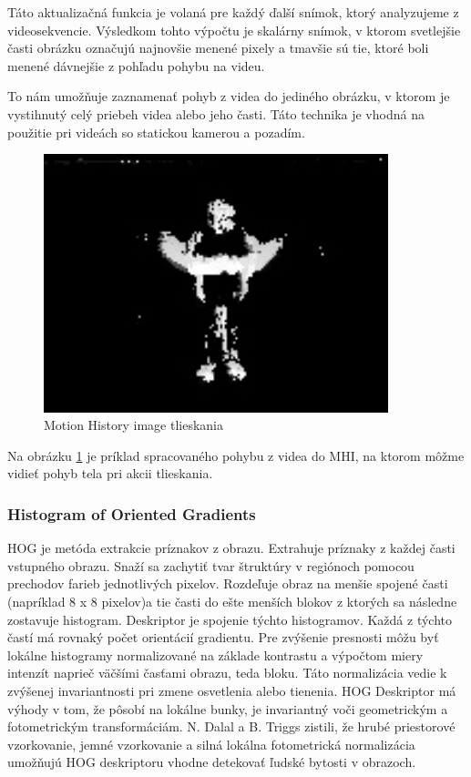 Táto aktualizačná funkcia je volaná pre každý ďalší snímok, ktorý analyzujeme z videosekvencie. Výsledkom tohto výpočtu je skalárny snímok, v ktorom svetlejšie časti obrázku označujú najnovšie menené pixely a tmavšie sú tie, ktoré boli menené dávnejšie z pohľadu pohybu na videu.

To nám umožňuje zaznamenať pohyb z videa do jediného obrázku, v ktorom je vystihnutý celý priebeh videa alebo jeho časti. Táto technika je vhodná na použitie pri videách so statickou kamerou a pozadím.\cite{c10}

\begin{figure}[!htbp]
  \centering
  \includegraphics[width=10cm]{img/MHIclap.jpg}
  \caption{Motion History image tlieskania}
  \label{MHIclap}
\end{figure}

Na obrázku \ref{MHIclap} je príklad spracovaného pohybu z videa do MHI, na ktorom môžme vidieť pohyb tela pri akcii tlieskania.

	 

\subsubsection{Histogram of Oriented Gradients} \label{HOGlabel}
HOG je metóda extrakcie príznakov z obrazu. Extrahuje príznaky z každej časti vstupného obrazu. Snaží sa zachytiť tvar štruktúry v regiónoch pomocou prechodov farieb jednotlivých pixelov. Rozdeľuje obraz na menšie spojené časti (napríklad 8 x 8 pixelov)a tie časti do ešte menších blokov z ktorých sa následne zostavuje histogram. Deskriptor je spojenie týchto histogramov.  Každá z týchto častí  má rovnaký počet orientácií gradientu.  Pre zvýšenie presnosti môžu byť lokálne histogramy normalizované na základe kontrastu a výpočtom miery intenzít naprieč väčšími časťami obrazu, teda bloku. Táto normalizácia vedie k zvýšenej invariantnosti pri zmene osvetlenia alebo tienenia. HOG Deskriptor má výhody v tom, že pôsobí na lokálne bunky, je invariantný voči geometrickým a fotometrickým transformáciám. N. Dalal a B. Triggs zistili, že hrubé priestorové vzorkovanie, jemné vzorkovanie a silná lokálna fotometrická normalizácia umožňujú HOG deskriptoru vhodne detekovať ľudské bytosti v obrazoch. 

